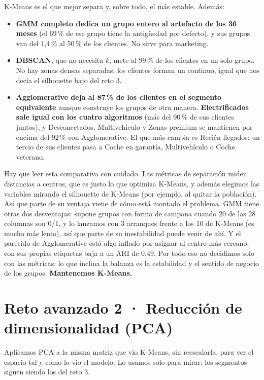 \documentclass[11pt,a4paper]{article}
\begin{document}
K-Means es el que mejor separa y, sobre todo, el más estable. Además:

\begin{itemize}
  \item \textbf{GMM completo dedica un grupo entero al artefacto de los 36 meses} (el 69\,\% de ese grupo tiene la antigüedad por defecto), y sus grupos van del 1,4\,\% al 50\,\% de los clientes. No sirve para marketing.
  \item \textbf{DBSCAN}, que no necesita $k$, mete al 99\,\% de los clientes en un solo grupo. No hay zonas densas separadas: los clientes forman un continuo, igual que nos decía el silhouette bajo del reto 3.
  \item \textbf{Agglomerative deja al 87\,\% de los clientes en el segmento equivalente} aunque construye los grupos de otra manera. \textbf{Electrificados sale igual con los cuatro algoritmos} (más del 90\,\% de sus clientes juntos), y Desconectados, Multivehículo y Zonas premium se mantienen por encima del 92\,\% con Agglomerative. El que más cambia es Recién llegados: un tercio de sus clientes pasa a Coche en garantía, Multivehículo o Coche veterano.
\end{itemize}

Hay que leer esta comparativa con cuidado. Las métricas de separación miden distancias a centros, que es justo lo que optimiza K-Means, y además elegimos las variables mirando el silhouette de K-Means (por ejemplo, al quitar la población). Así que parte de su ventaja viene de cómo está montado el problema. GMM tiene otras dos desventajas: supone grupos con forma de campana cuando 20 de las 28 columnas son 0/1, y lo lanzamos con 3 arranques frente a los 10 de K-Means (es mucho más lento), así que parte de su inestabilidad puede venir de ahí. Y el parecido de Agglomerative está algo inflado por asignar al centro más cercano: con sus propias etiquetas baja a un ARI de 0,49. Por todo eso no decidimos solo con las métricas: lo que inclina la balanza es la estabilidad y el sentido de negocio de los grupos. \textbf{Mantenemos K-Means.}

\section{Reto avanzado 2 · Reducción de dimensionalidad (PCA)}

Aplicamos PCA a la misma matriz que vio K-Means, sin reescalarla, para ver el espacio tal y como lo vio el modelo. Lo usamos solo para mirar: los segmentos siguen siendo los del reto 3.
\end{document}
